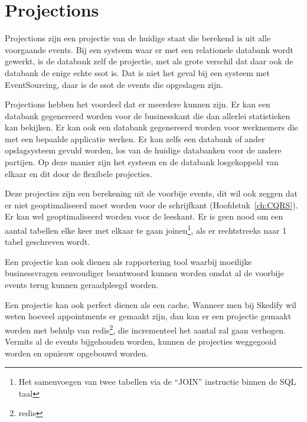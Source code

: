 
\section{Projections}
\label{sec:projections}

Projections zijn een projectie van de huidige staat die berekend is uit alle voorgaande events. Bij een systeem waar er met een relationele databank wordt gewerkt, is de databank zelf de projectie, met als grote verschil dat daar ook de databank de enige echte \gls{ssot} is. Dat is niet het geval bij een systeem met EventSourcing, daar is de \gls{ssot} de events die opgeslagen zijn.

Projections hebben het voordeel dat er meerdere kunnen zijn. Er kan een databank gegenereerd worden voor de businesskant die dan allerlei statistieken kan bekijken. Er kan ook een databank gegenereerd worden voor werknemers die met een bepaalde applicatie werken. Er kan zelfs een databank of ander opslagsysteem gevuld worden, los van de huidige databanken voor de andere partijen. Op deze manier zijn het systeem en de databank losgekoppeld van elkaar en dit door de flexibele projecties. 

Deze projecties zijn een berekening uit de voorbije events, dit wil ook zeggen dat er niet geoptimaliseerd moet worden voor de schrijfkant (Hoofdstuk~\ref{ch:CQRS}). Er kan wel geoptimaliseerd worden voor de leeskant. Er is geen nood om een aantal tabellen elke keer met elkaar te gaan joinen\footnote{Het samenvoegen van twee tabellen via de ``JOIN'' instructie binnen de \gls{SQL} taal}, als er rechtstreeks naar 1 tabel geschreven wordt.

Een projectie kan ook dienen als rapportering tool waarbij moeilijke businessvragen eenvoudiger beantwoord kunnen worden omdat al de voorbije events terug kunnen geraadpleegd worden.

Een projectie kan ook perfect dienen als een \gls{cache}. Wanneer men bij Skedify wil weten hoeveel appointments er gemaakt zijn, dan kan er een projectie gemaakt worden met behulp van \gls{redis}\footnote{\glsdesc{redis}}, die incrementeel het aantal zal gaan verhogen. Vermits al de events bijgehouden worden, kunnen de projecties weggegooid worden en opnieuw opgebouwd worden.
